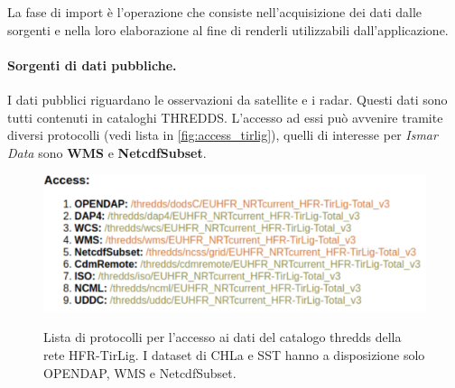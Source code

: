 \documentclass[./main.tex]{subfiles}
\begin{document}
La fase di import è l'operazione che consiste nell'acquisizione dei dati dalle sorgenti e nella loro elaborazione al fine di renderli utilizzabili dall'applicazione.\par

\paragraph{Sorgenti di dati pubbliche.}
I dati pubblici riguardano le osservazioni da satellite e i radar. Questi dati sono tutti contenuti in cataloghi THREDDS. L'accesso ad essi può avvenire tramite diversi protocolli (vedi lista in \autoref{fig:access_tirlig}), quelli di interesse per \textit{Ismar Data} sono \textbf{WMS} e \textbf{NetcdfSubset}.
\begin{figure}[!ht]
\noindent\begin{minipage}{0.5\textwidth}
\vspace{1cm}
\includegraphics[width=\textwidth]{images/dataset_access.pdf}
\captionsetup{font=small, hypcap=false}
\label{fig:access_tirlig}
\end{minipage}
\hspace{0.05\textwidth}
\begin{minipage}{0.4\textwidth}
\begin{small}
Lista di protocolli per l'accesso ai dati del catalogo thredds della rete HFR-TirLig. I dataset di CHLa e SST hanno a disposizione solo OPENDAP, WMS e NetcdfSubset.
\end{small}
\end{minipage}
\vspace{0.25cm}
\end{figure}
\end{document}
